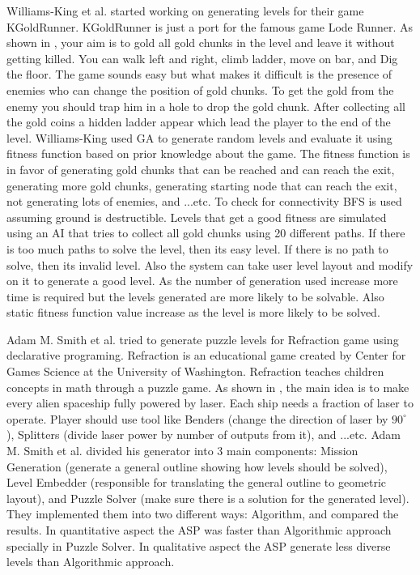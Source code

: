 Williams-King et al.\cite{kgrAutomaticGeneration} started working on generating levels for their game KGoldRunner. KGoldRunner is just a port for the famous game Lode Runner. As shown in , your aim is to gold all gold chunks in the level and leave it without getting killed. You can walk left and right, climb ladder, move on bar, and Dig the floor. The game sounds easy but what makes it difficult is the presence of enemies who can change the position of gold chunks. To get the gold from the enemy you should trap him in a hole to drop the gold chunk. After collecting all the gold coins a hidden ladder appear which lead the player to the end of the level. Williams-King used GA to generate random levels and evaluate it using fitness function based on prior knowledge about the game. The fitness function is in favor of generating gold chunks that can be reached and can reach the exit, generating more gold chunks, generating starting node that can reach the exit, not generating lots of enemies, and ...etc. To check for connectivity BFS is used assuming ground is destructible. Levels that get a good fitness are simulated using an AI that tries to collect all gold chunks using 20 different paths. If there is too much paths to solve the level, then its easy level. If there is no path to solve, then its invalid level. Also the system can take user level layout and modify on it to generate a good level. As the number of generation used increase more time is required but the levels generated are more likely to be solvable. Also static fitness function value increase as the level is more likely to be solved. 


Adam M. Smith et al.\cite{refractionStudy} tried to generate puzzle levels for Refraction game using declarative programing. Refraction is an educational game created by Center for Games Science at the University of Washington. Refraction teaches children concepts in math through a puzzle game. As shown in , the main idea is to make every alien spaceship fully powered by laser. Each ship needs a fraction of laser to operate. Player should use tool like Benders (change the direction of laser by $90^{\circ}$), Splitters (divide laser power by number of outputs from it), and ...etc. Adam M. Smith et al. divided his generator into 3 main components: Mission Generation (generate a general outline showing how levels should be solved), Level Embedder (responsible for translating the general outline to geometric layout), and Puzzle Solver (make sure there is a solution for the generated level). They implemented them into two different ways: Algorithm,  and compared the results. In quantitative aspect the ASP was faster than Algorithmic approach specially in Puzzle Solver. In qualitative aspect the ASP generate less diverse levels than Algorithmic approach. 


